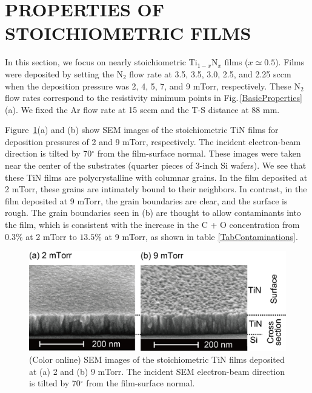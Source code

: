 \documentclass{report}
\begin{document}
\section{PROPERTIES OF STOICHIOMETRIC FILMS}
\label{PROPERTIES OF STOICHIOMETRIC FILMS}

In this section, we focus on nearly stoichiometric Ti$_{1-x}$N$_{x}$ films ($x \simeq 0.5$).  Films were deposited by setting the N$_{2}$ flow rate at 3.5, 3.5, 3.0, 2.5, and 2.25 sccm when the deposition pressure was 2, 4, 5, 7, and 9 mTorr, respectively. These N$_{2}$ flow rates correspond to the resistivity minimum points in Fig.\,\ref{BasicProperties}(a). We fixed the Ar flow rate at 15 sccm and the T-S distance at 88 mm.

Figure \,\ref{SEM2-9}(a) and (b) show SEM images of the stoichiometric TiN films for deposition pressures of 2 and 9 mTorr, respectively. The incident electron-beam direction is tilted by 70$^{\circ}$ from the film-surface normal. These images were taken near the center of the substrates (quarter pieces of 3-inch Si wafers). We see that these TiN films are polycrystalline with columnar grains. In the film deposited at 2 mTorr, these grains are intimately bound to their neighbors. In contrast, in the film deposited at 9 mTorr, the grain boundaries are clear, and the surface is rough. The grain boundaries seen in (b) are thought to allow contaminants into the film, which is consistent with the increase in the C + O concentration from $0.3\%$ at 2 mTorr to $13.5\%$ at 9 mTorr, as shown in table \ref{TabContaminations}.

\begin{figure}
\begin{center}


\includegraphics{SEM2-9.jpg}

\end{center}
\caption{(Color online) SEM images of the stoichiometric TiN films deposited at (a) 2 and (b) 9 mTorr. The incident SEM electron-beam direction is tilted by 70$^{\circ}$ from the film-surface normal.}
\label{SEM2-9}
\end{figure}
\end{document}
